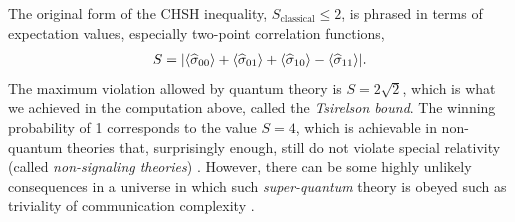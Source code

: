 The original form of the CHSH inequality, $S_{\textrm{classical}} \le 2$, is phrased in terms of expectation values, especially two-point correlation functions,
\begin{align}
	S = \abs{\left\langle \widehat{\sigma}_{00} \right\rangle + \left\langle \widehat{\sigma}_{01} \right\rangle + \left\langle \widehat{\sigma}_{10} \right\rangle - \left\langle \widehat{\sigma}_{11} \right\rangle}.
\end{align}
The maximum violation allowed by quantum theory is $S = 2\sqrt{2}$, which is what we achieved in the computation above, called the \emph{Tsirelson bound}. The winning probability of 1 corresponds to the value $S=4$, which is achievable in non-quantum theories that, surprisingly enough, still do not violate special relativity (called \emph{non-signaling theories}) \cite{pr-box}. However, there can be some highly unlikely consequences in a universe in which such  \emph{super-quantum} theory is obeyed such as triviality of communication complexity \cite{vandam2012}.


